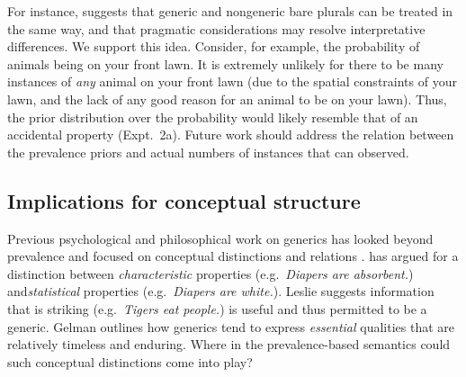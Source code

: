 \documentclass[12pt,letterpaper]{article}
\begin{document}
For instance,  suggests that generic and nongeneric bare plurals can be treated in the same way, and that pragmatic considerations may resolve interpretative differences. 
We support this idea.
Consider, for example, the probability of animals being on your front lawn. 
It is extremely unlikely for there to be many instances of \emph{any} animal on your front lawn (due to the spatial constraints of your lawn, and the lack of any good reason for an animal to be on your lawn). 
Thus, the prior distribution over the probability would likely resemble that of an accidental property (Expt.~2a).
Future work should address the relation between the prevalence priors and actual numbers of instances that can observed.





\subsection*{Implications for conceptual structure}


Previous psychological and philosophical work on generics has looked beyond prevalence and focused on conceptual distinctions and relations \cite{Gelman2003,Prasada2013,Leslie2007,Leslie2008}. 
\citeauthor{Prasada2013} has argued for a distinction between \emph{characteristic} properties (e.g.~\emph{Diapers are absorbent.}) and\emph{statistical} properties (e.g.~\emph{Diapers are white.}).
Leslie suggests information that is striking (e.g.~\emph{Tigers eat people.}) is useful and thus permitted to be a generic.
Gelman outlines how generics tend to express \emph{essential} qualities that are relatively timeless and enduring. 
Where in the prevalence-based semantics could such conceptual distinctions come into play?
\end{document}
